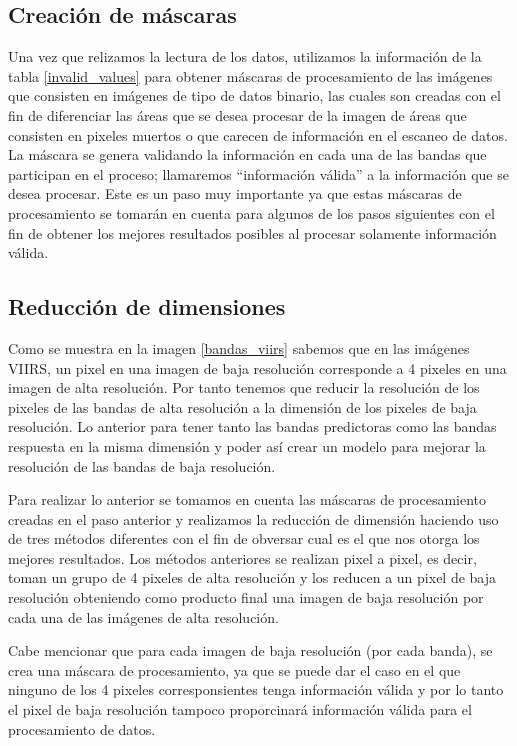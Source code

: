 \subsection{Creación de máscaras}

Una vez que relizamos la lectura de los datos, utilizamos la información de la tabla \ref{invalid_values} para obtener máscaras de procesamiento de las imágenes que consisten en imágenes de tipo de datos binario, las cuales son creadas con el fin de diferenciar las áreas que se desea procesar de la imagen de áreas que consisten en pixeles muertos o que carecen de información en el escaneo de datos. La máscara se genera validando la información en cada una de las bandas que participan en el proceso; llamaremos ``información válida'' a la información que se desea procesar. Este es un paso muy importante ya que estas máscaras de procesamiento se tomarán en cuenta para algunos de los pasos siguientes con el fin de obtener los mejores resultados posibles al procesar solamente información válida. 

\subsection{Reducción de dimensiones}

Como se muestra en la imagen \ref{bandas_viirs} sabemos que en las imágenes VIIRS, un pixel en una imagen de baja resolución corresponde a 4 pixeles en una imagen de alta resolución. Por tanto tenemos que reducir la resolución de los pixeles de las bandas de alta resolución a la dimensión de los pixeles de baja resolución. Lo anterior para tener tanto las bandas predictoras como las bandas respuesta en la misma dimensión y poder así crear un modelo para mejorar la resolución de las bandas de baja resolución. 

Para realizar lo anterior se tomamos en cuenta las máscaras de procesamiento creadas en el paso anterior y realizamos la reducción de dimensión haciendo uso de tres métodos diferentes con el fin de obversar cual es el que nos otorga los mejores resultados. Los métodos anteriores se realizan pixel a pixel, es decir, toman un grupo de 4 pixeles de alta resolución y los reducen a un pixel de baja resolución obteniendo como producto final una imagen de baja resolución por cada una de las imágenes de alta resolución.

Cabe mencionar que para cada imagen de baja resolución (por cada banda), se crea una máscara de procesamiento, ya que se puede dar el caso en el que ninguno de los 4 pixeles corresponsientes tenga información válida y por lo tanto el pixel de baja resolución tampoco proporcinará información válida para el procesamiento de datos.

